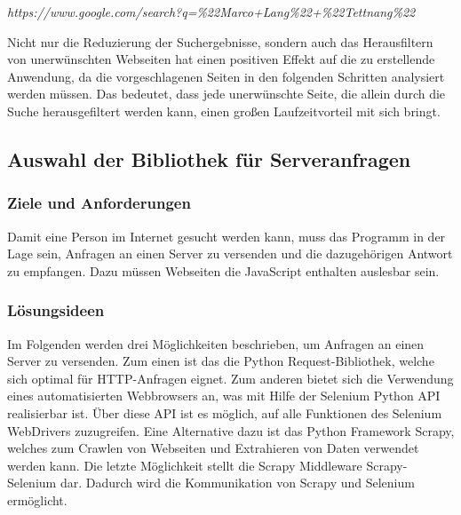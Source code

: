 			\textit{https://www.google.com/search?q=\%22Marco+Lang\%22+\%22Tettnang\%22}
			
			Nicht nur die Reduzierung der Suchergebnisse, sondern auch das Herausfiltern von unerwünschten Webseiten hat einen positiven Effekt auf die zu erstellende Anwendung, da die vorgeschlagenen Seiten in den folgenden Schritten analysiert werden müssen. Das bedeutet, dass jede unerwünschte Seite, die allein durch die Suche herausgefiltert werden kann, einen großen Laufzeitvorteil mit sich bringt. 
			
			
		
		\subsection{Auswahl der Bibliothek für Serveranfragen}
			\subsubsection{Ziele und Anforderungen}
				Damit eine Person im Internet gesucht werden kann, muss das Programm in der Lage sein, Anfragen an einen Server zu versenden und die dazugehörigen Antwort zu empfangen. Dazu müssen Webseiten die JavaScript enthalten auslesbar sein.
			\subsubsection{Lösungsideen}
				Im Folgenden werden drei Möglichkeiten beschrieben, um Anfragen an einen Server zu versenden. Zum einen ist das die Python Request-Bibliothek, welche sich optimal für HTTP-Anfragen eignet.\cite{WebScraping} Zum anderen bietet sich die Verwendung eines automatisierten Webbrowsers an, was mit Hilfe der Selenium Python API realisierbar ist.\cite{lawson2015web} Über diese API ist es möglich, auf alle Funktionen des Selenium WebDrivers zuzugreifen.\cite{SeleniumWithPython} Eine Alternative dazu ist das Python Framework Scrapy, welches zum Crawlen von Webseiten und Extrahieren von Daten verwendet werden kann.\cite{Scrapy} Die letzte Möglichkeit stellt die  Scrapy Middleware Scrapy-Selenium dar.\cite{scrapy-selenium} Dadurch wird die Kommunikation von Scrapy und Selenium ermöglicht.
